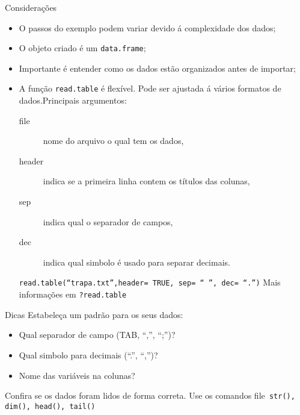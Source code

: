 \documentclass{beamer}
\begin{document}
 \begin{frame}{Considerações}
    \begin{itemize}
 \item O passos do exemplo podem variar devido á complexidade dos
   dados;
 \item O objeto criado é um \texttt{data.frame};
 \item Importante é entender  como os dados estão organizados antes de importar;
 \item  A função \texttt{read.table} é flexível. Pode ser ajustada á vários formatos de dados.\pause   Principais argumentos:
   \begin{description}
   \item [file] nome do arquivo o qual tem os dados,
   \item [header] indica se a primeira linha contem os títulos das colunas,
   \item[sep] indica qual o separador de campos,
   \item[dec] indica qual simbolo é usado para separar decimais.
   \end{description}
\pause
 \texttt{read.table(``trapa.txt'',header= TRUE, sep= `` '', dec= ``.'')}
\pause
Mais informações em \texttt{?read.table}
 \end{itemize}
 \end{frame}
 \begin{frame}{Dicas}
Estabeleça um padrão para os seus dados: \pause
\begin{itemize}
\item Qual separador de campo (TAB, ``,'', ``;'')?
\item Qual simbolo para decimais (``.'', ``,'')?
\item Nome das variáveis na colunas?
\end{itemize}
\pause
Confira se os dados foram lidos de forma correta. Use os comandos file\texttt{ str(), dim(), head(), tail()}
 \end{frame}
\end{document}
